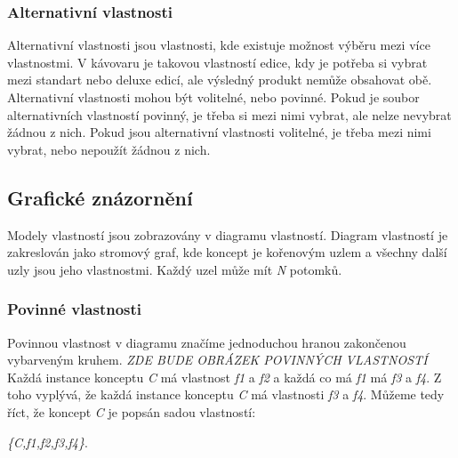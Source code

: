 \subsubsection{Alternativní vlastnosti}
Alternativní vlastnosti jsou vlastnosti, kde existuje možnost výběru mezi více vlastnostmi. V kávovaru je takovou vlastností edice, kdy je potřeba si vybrat mezi standart nebo deluxe edicí, ale výsledný produkt nemůže obsahovat obě. Alternativní vlastnosti mohou být volitelné, nebo povinné. Pokud je soubor alternativních vlastností povinný, je třeba si mezi nimi vybrat, ale nelze nevybrat žádnou z nich. Pokud jsou alternativní vlastnosti volitelné, je třeba mezi nimi vybrat, nebo nepoužít žádnou z nich.

\subsection{Grafické znázornění}
Modely vlastností jsou zobrazovány v diagramu vlastností. Diagram vlastností je zakreslován jako stromový graf, kde koncept je kořenovým uzlem a všechny další uzly jsou jeho vlastnostmi. Každý uzel může mít \textit{N} potomků.

\subsubsection{Povinné vlastnosti}
Povinnou vlastnost v diagramu značíme jednoduchou hranou zakončenou vybarveným kruhem.
\newline
\newline
\textit{ZDE BUDE OBRÁZEK POVINNÝCH VLASTNOSTÍ}
\newline
\newline
Každá instance konceptu \textit{C} má vlastnost \textit{f1} a \textit{f2} a každá co má \textit{f1} má \textit{f3} a \textit{f4}. Z toho vyplývá, že každá instance konceptu \textit{C} má vlastnosti \textit{f3} a \textit{f4}. Můžeme tedy říct, že koncept \textit{C} je popsán sadou vlastností:

\textit{\{C,f1,f2,f3,f4\}}.

